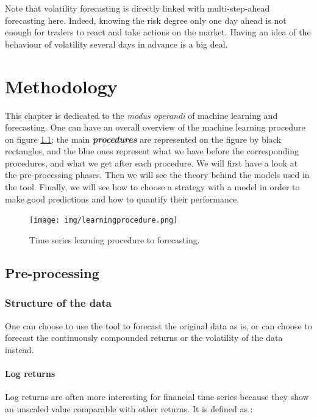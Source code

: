 \documentclass[11pt,a4paper,oneside]{book}
\begin{document}
Note that volatility forecasting is directly linked with multi-step-ahead forecasting here. Indeed, knowing the risk degree only one day ahead is not enough for traders to react and take actions on the market. Having an idea of the behaviour of volatility several days in advance is a big deal.




\chapter{Methodology}

This chapter is dedicated to the \textit{modus operandi} of machine learning and forecasting. One can have an overall overview of the machine learning procedure on figure \ref{fig:ML}; the main \textit{\textbf{procedures}} are represented on the figure by black rectangles, and the blue ones represent what we have before the corresponding procedures, and what we get after each procedure. We will first have a look at the pre-processing phases. Then we will see the theory behind the models used in the tool. Finally, we will see how to choose a strategy with a model in order to make good predictions and how to quantify their performance.

\begin{figure}[ht]
  \centering
    \texttt{[image: img/learningprocedure.png]}
  \caption{Time series learning procedure to forecasting.}
  \label{fig:ML}
\end{figure}



\section{Pre-processing}

\subsection{Structure of the data}

One can choose to use the tool to forecast the original data as is, or can choose to forecast the continuously compounded returns or the volatility of the data instead.

\subsubsection{Log returns}

Log returns are often more interesting for financial time series because they show an unscaled value comparable with other returns. It is defined as :
\end{document}

